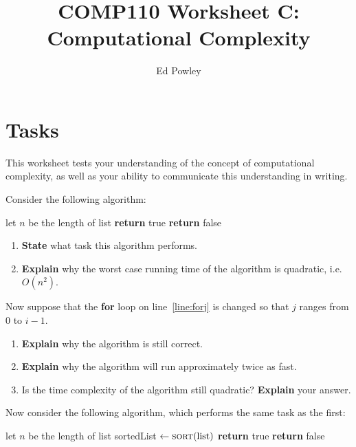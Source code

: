 \documentclass{../../../fal_assignment}
\title{COMP110 Worksheet C: Computational Complexity}
\author{Ed Powley}
\begin{document}
\maketitle
{}

\section*{Tasks}

This worksheet tests your understanding of the concept of computational complexity,
as well as your ability to communicate this understanding in writing.

Consider the following algorithm:

\begin{algorithmic}[1]
		\State let $n$ be the length of list
			 \label{line:forj}
					\State \textbf{return} true
				\EndIf
			\EndFor
		\EndFor
		\State \textbf{return} false
	\EndProcedure
\end{algorithmic}

\begin{enumerate}[label=(\alph*)]
	\item\label{q:first} \textbf{State} what task this algorithm performs.
	\item \textbf{Explain} why the worst case running time of the algorithm is quadratic, i.e.\ $O(n^2)$.
\end{enumerate}

Now suppose that the \textbf{for} loop on line~\ref{line:forj} is changed so that $j$ ranges from $0$ to $i-1$.

\begin{enumerate}[resume,label=(\alph*)]
	\item \textbf{Explain} why the algorithm is still correct.
	\item \textbf{Explain} why the algorithm will run approximately twice as fast.
	\item Is the time complexity of the algorithm still quadratic? \textbf{Explain} your answer.
\end{enumerate}

Now consider the following algorithm, which performs the same task as the first:

\begin{algorithmic}[1]
		\State let $n$ be the length of list
		\State sortedList $\gets \Call{sort}{\text{list}}$
				\State \textbf{return} true
			\EndIf
		\EndFor
		\State \textbf{return} false
	\EndProcedure
\end{algorithmic}
\end{document}
